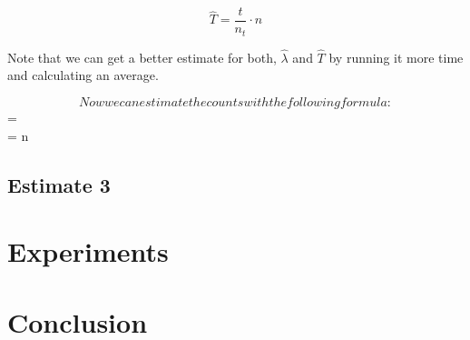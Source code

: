 \documentclass[a4paper]{article}
\begin{document}
$$\hat{T} = \frac{t}{n_t} \cdot n$$

Note that we can get a better estimate for both, $\hat{\lambda}$ and $\hat{T}$ by running it more time and calculating an average.

$$

Now we can estimate the counts with the following formula:

$$ = \lambda \cdot {} $$
$$  = \lambda \cdot {} \cdot n$$

\subsection{Estimate 3}


\section{Experiments}


\section{Conclusion}
\end{document}
